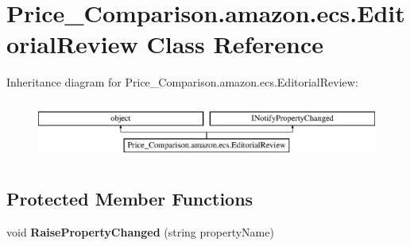 \hypertarget{class_price___comparison_1_1amazon_1_1ecs_1_1_editorial_review}{\section{Price\-\_\-\-Comparison.\-amazon.\-ecs.\-Editorial\-Review Class Reference}
\label{class_price___comparison_1_1amazon_1_1ecs_1_1_editorial_review}
}


 


Inheritance diagram for Price\-\_\-\-Comparison.\-amazon.\-ecs.\-Editorial\-Review\-:\begin{figure}[H]
\begin{center}
\leavevmode
\includegraphics[height=1.958042cm]{class_price___comparison_1_1amazon_1_1ecs_1_1_editorial_review}
\end{center}
\end{figure}
\subsection*{Protected Member Functions}
\begin{DoxyCompactItemize}
\item 
\hypertarget{class_price___comparison_1_1amazon_1_1ecs_1_1_editorial_review_ab31c124054594e63ec6486d35f3361b3}{void {\bfseries Raise\-Property\-Changed} (string property\-Name)}\label{class_price___comparison_1_1amazon_1_1ecs_1_1_editorial_review_ab31c124054594e63ec6486d35f3361b3}

\end{DoxyCompactItemize}
